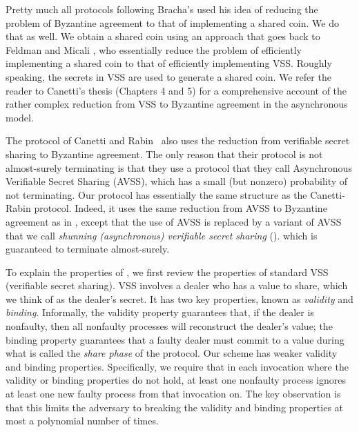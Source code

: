 \documentclass{sig-alternate}
\newcommand{\davss}{{\text{SVSS}}\xspace}
\begin{document}
Pretty much all protocols following Bracha's \citeyear{Bra84} used his
idea of reducing the problem of Byzantine agreement to that of
implementing a shared coin. We do that as well.
We obtain a shared coin using an approach that goes back to Feldman
and Micali \citeyear{FM88,FM97}, who essentially reduce
the problem of efficiently implementing a shared coin to that of
efficiently implementing VSS.
Roughly speaking, the secrets in VSS are used to generate a shared coin.
We refer
the reader to Canetti's thesis \cite{Can-thesis} (Chapters 4 and 5)
for a comprehensive account of the rather complex reduction from
VSS to Byzantine agreement in the asynchronous model.

The protocol of Canetti and Rabin~\cite{CR93}
also
uses the reduction from
verifiable secret sharing to Byzantine agreement.
The only reason that their protocol is not
almost-surely terminating is that they use a protocol that they call
Asynchronous Verifiable
Secret Sharing (AVSS), which has a small 
(but nonzero)
probability of not terminating.
Our protocol has essentially the same structure as the Canetti-Rabin
protocol.
Indeed, it
uses the same reduction from AVSS to Byzantine agreement as
in  \cite{CR93},
except that the use of AVSS is replaced by
a variant of AVSS that we call
\emph{shunning (asynchronous) verifiable secret sharing} (\davss).
which is guaranteed to terminate almost-surely.





To explain
the properties of \davss, we first review
the properties of standard
VSS
(verifiable secret sharing).
VSS involves a dealer who has a value to share, which we think of as the dealer's
secret.
It has two key
properties, known as \emph{validity} and \emph{binding}.
Informally, the validity property
guarantees that, if the dealer is nonfaulty, then all nonfaulty processes will
reconstruct
the
dealer's value; the binding property guarantees that a faulty
dealer must commit to a value during what is called the \emph{share
phase} of the protocol.
Our \davss scheme has weaker validity and binding properties.
Specifically, we require that in each invocation where the validity or binding
properties do not hold,
at least one nonfaulty process
ignores
at least one new faulty
process
from that invocation on.
The key observation is that this limits the
adversary to breaking the validity and binding properties at most a
polynomial number of times.
\end{document}
